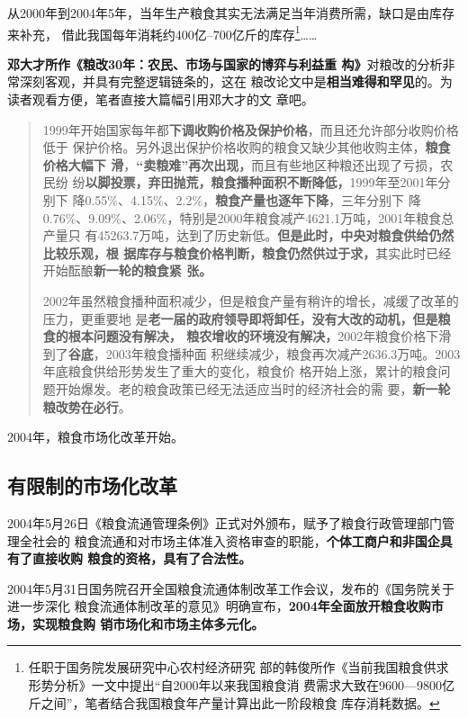 从2000年到2004年5年，当年生产粮食其实无法满足当年消费所需，缺口是由库存来补充，
借此我国每年消耗约400亿--700亿斤的库存\footnote{任职于国务院发展研究中心农村经济研究
  部的韩俊所作《当前我国粮食供求形势分析》一文中提出“自2000年以来我国粮食消
  费需求大致在9600—9800亿斤之间”，笔者结合我国粮食年产量计算出此一阶段粮食
  库存消耗数据。}……

\textbf{邓大才所作《粮改30年：农民、市场与国家的博弈与利益重
  构》}\cite{dacailianggai}对粮改的分析非常深刻客观，并具有完整逻辑链条的，这在
粮改论文中是\textbf{相当难得和罕见}的。为读者观看方便，笔者直接大篇幅引用邓大才的文
章吧。

\begin{quotation}
  1999年开始国家每年都\textbf{下调收购价格及保护价格}，而且还允许部分收购价格低于
  保护价格。另外退出保护价格收购的粮食又缺少其他收购主体，\textbf{粮食价格大幅下
    滑}，\textbf{“卖粮难”再次出现，}而且有些地区种粮还出现了亏损，农民纷
  纷\textbf{以脚投票，弃田抛荒，粮食播种面积不断降低，}1999年至2001年分别下
  降0.55\%、4.15\%、2.2\%，\textbf{粮食产量也逐年下降}，三年分别下
  降0.76\%、9.09\%、2.06\%，特别是2000年粮食减产4621.1万吨，2001年粮食总产量只
  有45263.7万吨，达到了历史新低。\textbf{但是此时，中央对粮食供给仍然比较乐观，根
    据库存与粮食价格判断，粮食仍然供过于求，}其实此时已经开始酝酿\textbf{新一轮的粮食紧
    张。}

  2002年虽然粮食播种面积减少，但是粮食产量有稍许的增长，减缓了改革的压力，更重要地
  是\textbf{老一届的政府领导即将卸任，没有大改的动机，但是粮食的根本问题没有解决，
    粮农增收的环境没有解决，}2002年粮食价格下滑到了\textbf{谷底}，2003年粮食播种面
  积继续减少，粮食再次减产2636.3万吨。2003年底粮食供给形势发生了重大的变化，粮食价
  格开始上涨，累计的粮食问题开始爆发。老的粮食政策已经无法适应当时的经济社会的需
  要，\textbf{新一轮粮改势在必行}。
\end{quotation}

2004年，粮食市场化改革开始。

\subsection{有限制的市场化改革}


2004年5月26日《粮食流通管理条例》正式对外颁布，赋予了粮食行政管理部门管理全社会的
粮食流通和对市场主体准入资格审查的职能，\textbf{个体工商户和非国企具有了直接收购
  粮食的资格，具有了合法性。}

2004年5月31日国务院召开全国粮食流通体制改革工作会议，发布的《国务院关于进一步深化
粮食流通体制改革的意见》明确宣布，\textbf{2004年全面放开粮食收购市场，实现粮食购
  销市场化和市场主体多元化。}

